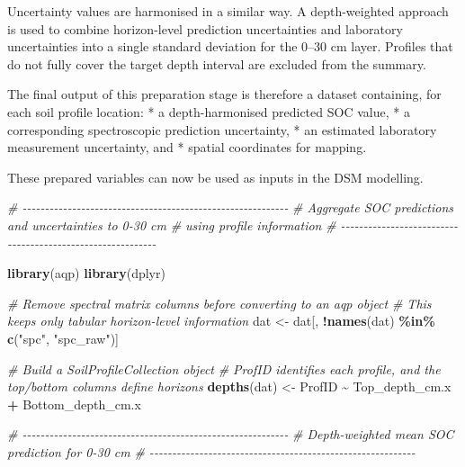 \documentclass[
  10pt,
  b5paper,
  oneside]{book}
\newenvironment{Shaded}{\begin{snugshade}}{\end{snugshade}}
\newcommand{\CommentTok}[1]{\textcolor[rgb]{0.56,0.35,0.01}{\textit{#1}}}
\newcommand{\FunctionTok}[1]{\textcolor[rgb]{0.13,0.29,0.53}{\textbf{#1}}}
\newcommand{\NormalTok}[1]{#1}
\newcommand{\OtherTok}[1]{\textcolor[rgb]{0.56,0.35,0.01}{#1}}
\newcommand{\SpecialCharTok}[1]{\textcolor[rgb]{0.81,0.36,0.00}{\textbf{#1}}}
\newcommand{\StringTok}[1]{\textcolor[rgb]{0.31,0.60,0.02}{#1}}
\begin{document}
Uncertainty values are harmonised in a similar way. A depth-weighted approach is used to combine horizon-level prediction uncertainties and laboratory uncertainties into a single standard deviation for the 0--30 cm layer. Profiles that do not fully cover the target depth interval are excluded from the summary.

The final output of this preparation stage is therefore a dataset containing, for each soil profile location:
* a depth-harmonised predicted SOC value,
* a corresponding spectroscopic prediction uncertainty,
* an estimated laboratory measurement uncertainty, and
* spatial coordinates for mapping.

These prepared variables can now be used as inputs in the DSM modelling.

\begin{Shaded}
\begin{Highlighting}[]
\CommentTok{\# {-}{-}{-}{-}{-}{-}{-}{-}{-}{-}{-}{-}{-}{-}{-}{-}{-}{-}{-}{-}{-}{-}{-}{-}{-}{-}{-}{-}{-}{-}{-}{-}{-}{-}{-}{-}{-}{-}{-}{-}{-}{-}{-}{-}{-}{-}{-}{-}{-}{-}{-}{-}{-}{-}{-}{-}{-}{-}{-}}
\CommentTok{\# Aggregate SOC predictions and uncertainties to 0{-}30 cm}
\CommentTok{\# using profile information}
\CommentTok{\# {-}{-}{-}{-}{-}{-}{-}{-}{-}{-}{-}{-}{-}{-}{-}{-}{-}{-}{-}{-}{-}{-}{-}{-}{-}{-}{-}{-}{-}{-}{-}{-}{-}{-}{-}{-}{-}{-}{-}{-}{-}{-}{-}{-}{-}{-}{-}{-}{-}{-}{-}{-}{-}{-}{-}{-}{-}{-}{-}}

\FunctionTok{library}\NormalTok{(aqp)}
\FunctionTok{library}\NormalTok{(dplyr)}

\CommentTok{\# Remove spectral matrix columns before converting to an aqp object}
\CommentTok{\# This keeps only tabular horizon{-}level information}
\NormalTok{dat }\OtherTok{\textless{}{-}}\NormalTok{ dat[, }\SpecialCharTok{!}\FunctionTok{names}\NormalTok{(dat) }\SpecialCharTok{\%in\%} \FunctionTok{c}\NormalTok{(}\StringTok{"spc"}\NormalTok{, }\StringTok{"spc\_raw"}\NormalTok{)]}

\CommentTok{\# Build a SoilProfileCollection object}
\CommentTok{\# ProfID identifies each profile, and the top/bottom columns define horizons}
\FunctionTok{depths}\NormalTok{(dat) }\OtherTok{\textless{}{-}}\NormalTok{ ProfID }\SpecialCharTok{\textasciitilde{}}\NormalTok{ Top\_depth\_cm.x }\SpecialCharTok{+}\NormalTok{ Bottom\_depth\_cm.x}

\CommentTok{\# {-}{-}{-}{-}{-}{-}{-}{-}{-}{-}{-}{-}{-}{-}{-}{-}{-}{-}{-}{-}{-}{-}{-}{-}{-}{-}{-}{-}{-}{-}{-}{-}{-}{-}{-}{-}{-}{-}{-}{-}{-}{-}{-}{-}{-}{-}{-}{-}{-}{-}{-}{-}{-}{-}{-}{-}{-}{-}{-}}
\CommentTok{\# Depth{-}weighted mean SOC prediction for 0{-}30 cm}
\CommentTok{\# {-}{-}{-}{-}{-}{-}{-}{-}{-}{-}{-}{-}{-}{-}{-}{-}{-}{-}{-}{-}{-}{-}{-}{-}{-}{-}{-}{-}{-}{-}{-}{-}{-}{-}{-}{-}{-}{-}{-}{-}{-}{-}{-}{-}{-}{-}{-}{-}{-}{-}{-}{-}{-}{-}{-}{-}{-}{-}{-}}


\end{Highlighting}
\end{Shaded}
\end{document}
